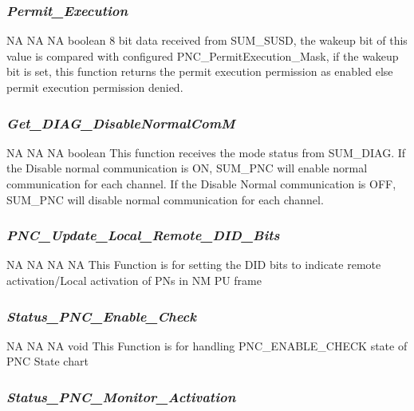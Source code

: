 \subsubsection{\textit{Permit_Execution}}

{NA}
{NA}
{NA}
{boolean}
{8 bit data received from SUM_SUSD, the wakeup bit of this value is compared with configured PNC_PermitExecution_Mask, if the wakeup bit is set, this function returns the permit execution permission as enabled else permit execution permission denied.}

{   }

\subsubsection{\textit{Get_DIAG_DisableNormalComM}}

{NA}
{NA}
{NA}
{boolean}
{This function receives the mode status from SUM_DIAG. If the Disable normal communication is ON, SUM_PNC will enable normal communication for each channel. If the Disable Normal communication is OFF, SUM_PNC will disable normal communication for each channel.}

{}

\subsubsection{\textit{PNC_Update_Local_Remote_DID_Bits}}

{NA}
{NA}
{NA}
{NA}
{This Function is for setting the DID bits to indicate remote activation/Local activation of PNs in NM PU frame}

\subsubsection{\textit{Status_PNC_Enable_Check}}


{NA}
{NA}
{NA}
{void}
{This Function is for handling PNC_ENABLE_CHECK state of PNC State chart}

{}

\subsubsection{\textit{Status_PNC_Monitor_Activation}}

